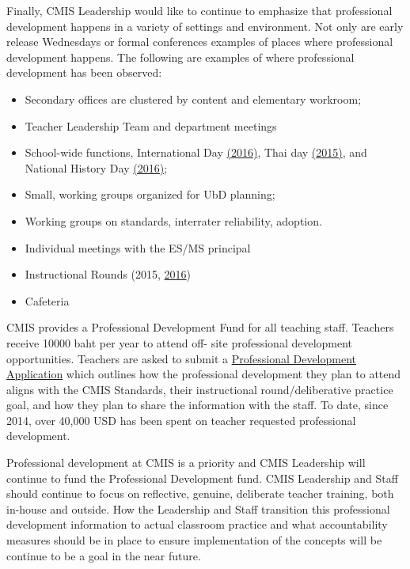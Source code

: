 \begin{findings}
 
Finally, CMIS Leadership would like to continue to emphasize that professional development happens in a variety of settings and environment.  Not only are early release Wednesdays or formal conferences examples of places where professional development happens. The following are examples of where professional development has been observed:
\begin{itemize}
\item Secondary offices are clustered by content and elementary workroom; 
\item Teacher Leadership Team and department meetings
\item School-wide functions, International Day \href{https://drive.google.com/drive/folders/0B0TYmzaZNi3fbnhzMzNNT3hKNm8?usp=sharing}{(2016)}, Thai day \href{https://drive.google.com/drive/folders/0B0TYmzaZNi3ffjNvUG85bU12TExQR1ZjMGtqcVZ1UFZrYWpwNHFGbDg2NFdrcDVmRmxkMmM?usp=sharing}{(2015)}, and National History Day \href{https://drive.google.com/drive/folders/0B0TYmzaZNi3fUkdpR1hLaDVaekk?usp=sharing}{(2016)};
\item Small, working groups organized for UbD planning;
\item Working groups on standards, interrater reliability, adoption. 
\item Individual meetings with the ES/MS principal
\item Instructional Rounds (2015, \href{https://drive.google.com/drive/folders/0B0TYmzaZNi3fbFVYTXpySHNDLUU?usp=sharing}{2016})
\item Cafeteria 
\end{itemize}


CMIS provides a Professional Development Fund for all teaching staff. Teachers receive 10000 baht per year to attend off- site professional development opportunities. Teachers are asked to submit a \href{https://docs.google.com/document/d/1zDwr8diiahPkrMQktXVF2-Us5eL-uVJDvdQLrbDNo8Q/edit}{Professional Development Application} which outlines how the professional development they plan to attend aligns with the CMIS Standards, their instructional round/deliberative practice goal, and how they plan to share the information with the staff. To date, since 2014, over 40,000 USD has been spent on teacher requested professional development. 


Professional development at CMIS is a priority and CMIS Leadership will continue to fund the Professional Development fund. CMIS Leadership and Staff should continue to focus on reflective, genuine, deliberate teacher training, both in-house and outside. How the Leadership and Staff transition this professional development information to actual classroom practice and what accountability measures should be in place to ensure implementation of the concepts will be continue to be a goal in the near future. 
\end{findings}

